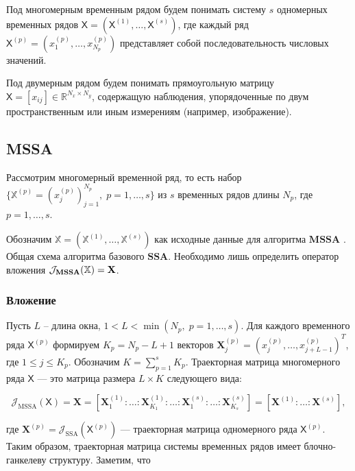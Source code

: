 \documentclass[a4paper, 11pt]{article}
\newcommand{\SSA}{\textbf{SSA}}
\newcommand{\MSSA}{\textbf{MSSA}}
\newcommand{\DSSA}{\textbf{2d-SSA}}
\newcommand{\TS}{\mathsf{X}}
\begin{document}
Под многомерным временным рядом будем понимать систему $s$ одномерных временных рядов $\TS = (\TS^{(1)}, \ldots, \TS^{(s)})$, где каждый ряд $\TS^{(p)} = (x_1^{(p)}, \ldots, x_{N_p}^{(p)})$ представляет собой последовательность числовых значений.

Под двумерным рядом будем понимать прямоугольную матрицу $\TS = [x_{ij}] \in \mathbb{R}^{N_x \times N_y}$, содержащую наблюдения, упорядоченные по двум пространственным или иным измерениям (например, изображение).



\subsection{MSSA}

Рассмотрим многомерный временной ряд, то есть набор $\{\mathbb{X}^{(p)} = \left({x^{(p)}_{j}}\right) _{j=1}^{N_p}, \; p = 1, \ldots, s\}$ из $s$ временных рядов длины $N_p$, где $p = 1, \ldots, s$.

Обозначим $\mathbb{X} = (\mathbb{X}^{(1)}, \ldots, \mathbb{X}^{(s)})$ как исходные данные для алгоритма $\MSSA$ \cite{ssa_with_R}. Общая схема алгоритма базового $\SSA$. Необходимо лишь определить оператор вложения $\mathcal{J}_{\text{\MSSA}}(\mathbb{X}) = \mathbf X$.

\subsubsection{Вложение}

Пусть $L$ -- длина окна, $1 < L < \min(N_p, \; p = 1, \ldots, s)$. Для каждого временного ряда $\TS^{(p)}$ формируем $K_p = N_p - L + 1$ векторов $\mathbf{X}_j^{(p)} = (x_j^{(p)}, \ldots, x_{j+L-1}^{(p)})^T$, где $1 \leq j \leq K_p$. Обозначим $K = \sum_{p=1}^s K_p$. Траекторная матрица многомерного ряда $\TS$ — это матрица размера $L \times K$ следующего вида:

\[
	\mathcal{J}_{\text{MSSA}}(\TS) = \mathbf{X} = [\mathbf{X}_1^{(1)} : \ldots : \mathbf{X}_{K_1}^{(1)} : \ldots : \mathbf{X}_1^{(s)} : \ldots : \mathbf{X}_{K_s}^{(s)}] = [\mathbf{X}^{(1)} : \ldots : \mathbf{X}^{(s)}],
\]

где $\mathbf{X}^{(p)} = \mathcal{J}_{\text{SSA}}(\TS^{(p)})$ — траекторная матрица одномерного ряда $\TS^{(p)}$. Таким образом, траекторная матрица системы временных рядов имеет блочно-ганкелеву структуру. Заметим, что
\end{document}
